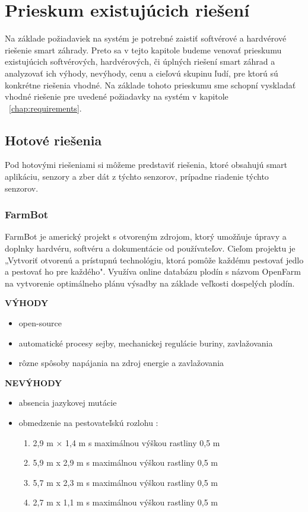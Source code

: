\documentclass[twoside]{ctuthesis}
\theoremstyle{plain}
\theoremstyle{definition}
\theoremstyle{note}
\begin{document}
\chapter{Prieskum existujúcich riešení}
Na základe požiadaviek na systém je potrebné zaistiť softvérové a hardvérové riešenie smart záhrady. Preto sa v tejto kapitole budeme venovať prieskumu existujúcich softvérových, hardvérových, či úplných riešení smart záhrad a analyzovať ich výhody, nevýhody, cenu a cieľovú skupinu ľudí, pre ktorú sú konkrétne riešenia vhodné. Na základe tohoto prieskumu sme schopní vyskladať vhodné riešenie pre uvedené požiadavky na systém  v kapitole ~\ref{chap:requirements}.
\section{Hotové riešenia}
Pod hotovými riešeniami si môžeme predstaviť riešenia, ktoré obsahujú smart aplikáciu, senzory a zber dát z týchto senzorov, prípadne riadenie týchto senzorov.
\subsection*{FarmBot}
FarmBot je americký projekt s otvoreným zdrojom, ktorý umožňuje úpravy a doplnky hardvéru, softvéru a dokumentácie od používateľov. 
Cieľom projektu je „Vytvoriť otvorenú a prístupnú technológiu, ktorá pomôže každému pestovať jedlo a pestovať ho pre každého".
Využíva online databázu plodín s názvom OpenFarm na vytvorenie optimálneho plánu výsadby na základe veľkosti dospelých plodín.  \cite{farmbot}
\newline

\textbf{VÝHODY}
\begin{itemize}
\item open-source
\item automatické procesy sejby, mechanickej regulácie buriny, zavlažovania
\item rôzne spôsoby napájania na zdroj energie a zavlažovania
\end{itemize}

\textbf{NEVÝHODY}
\begin{itemize}
\item  absencia jazykovej mutácie
\item  obmedzenie na pestovateľskú rozlohu : 
	\begin{enumerate}
	\item 2,9 m × 1,4 m s maximálnou výškou rastliny 0,5 m
	\item 5,9 m x 2,9 m s maximálnou výškou rastliny 0,5 m
	\item 5,7 m x 2,3 m s maximálnou výškou rastliny 0,5 m
	\item 2,7 m x 1,1 m s maximálnou výškou rastliny 0,5 m
	\end{enumerate}
\end{itemize}
	
\end{document}
